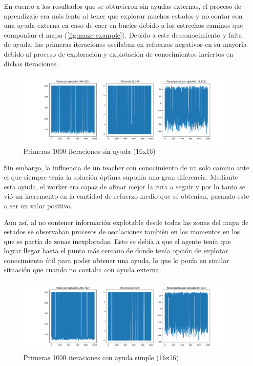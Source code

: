 \documentclass[letterpaper]{article} %
\begin{document}
En cuento a los resultados que se obtuvieron sin ayudas externas, el proceso de aprendizaje era más lento al tener que explorar muchos estados y
 no contar con una ayuda externa en caso de caer en bucles debido a los estrechos caminos que componían el mapa (\ref{fig:maze-example}). Debido
  a este desconocimiento y falta de ayuda, las primeras iteraciones oscilaban en refuerzos negativos en su mayoría debido al proceso de exploración
   y explotación de conocimientos inciertos en dichas iteraciones. 

\begin{figure}[H]
    \centering
    \includegraphics[width=0.9\columnwidth]{sin_ayuda_externa.png}
    \caption{Primeras 1000 iteraciones sin ayuda (16x16)\label{fig:FuN1}}
\end{figure}

Sin embargo, la influencia de un teacher con conocimiento de un solo camino ante el que siempre tenía la solución óptima suponía una gran diferencia.
 Mediante esta ayuda, el worker era capaz de afinar mejor la ruta a seguir y por lo tanto se vió un incremento en la cantidad de refuerzo medio que 
 se obtenían, pasando este a ser un valor positivo.

Aun así, al no contener información explotable desde todas las zonas del mapa de estados se observaban procesos de oscilaciones también en los momentos
 en los que se partía de zonas inexploradas. Esto se debía a que el agente tenía que lograr llegar hasta el punto más cercano de donde tenía opción 
 de explotar conocimiento útil para poder obtener una ayuda, lo que lo ponía en similar situación que cuando no contaba con ayuda externa.

\begin{figure}[H]
    \centering
    \includegraphics[width=0.9\columnwidth]{ayuda_externa_1path.png}
    \caption{Primeras 1000 iteraciones con ayuda simple (16x16)\label{fig:FuN2}}
    
\end{figure}
\end{document}
